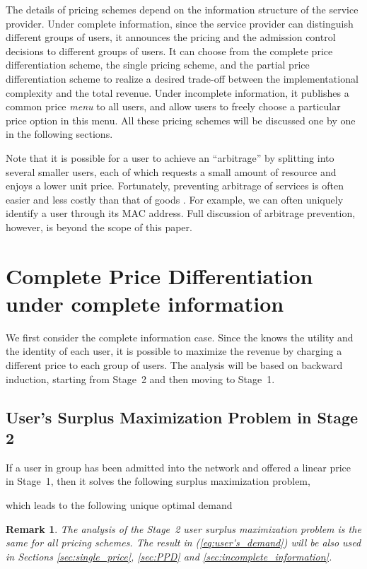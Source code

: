 \documentclass[twocolumn,10pt,twosided]{IEEEtran}
\newtheorem{remark}{Remark}
\begin{document}
The details of pricing schemes depend on the information structure of the service provider. Under complete information, since the service provider can distinguish different groups of users, it announces the pricing and the admission control decisions to different groups of users. It can choose from the complete price differentiation scheme, the single pricing scheme, and the partial price differentiation scheme to realize a desired trade-off between the implementational complexity and the total revenue. Under incomplete information, it publishes a common price \emph{menu} to all users, and allow users to freely choose a particular price option in this menu. All these pricing schemes will be discussed one by one in the following sections.

Note that it is possible for a user to achieve an ``arbitrage'' by splitting into several smaller users, each of which requests a small amount of resource and enjoys a lower unit price. Fortunately, preventing arbitrage of services is often easier and less costly than that of goods \cite{pashigian1995price}. For example, we can often uniquely  identify a user through its MAC address. Full discussion of arbitrage prevention, however, is beyond the scope of this paper.

\section{Complete Price Differentiation under complete information}
\label{sec:cpd}
We first consider the complete information case. Since the  knows the utility and the identity of each user, it is possible to maximize the revenue by charging a different price to each group of users. The analysis will be based on backward induction, starting from Stage~2 and then moving to Stage~1.
\subsection{User's Surplus Maximization Problem in Stage 2}
If a user in group  has been admitted into the network and offered a linear price  in Stage~1, then it solves the following surplus maximization problem,

which leads to the following unique optimal demand

\begin{remark}
The analysis of the Stage~2 user surplus maximization problem is the same for all pricing schemes. The result in (\ref{eq:user's_demand}) will be also used in Sections \ref{sec:single_price}, \ref{sec:PPD} and \ref{sec:incomplete_information}.
\end{remark}
\end{document}
